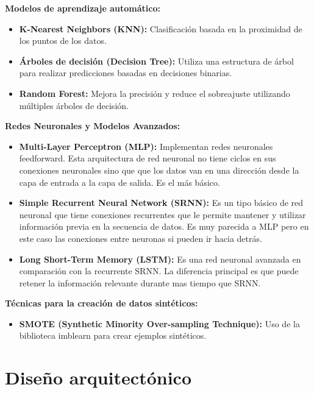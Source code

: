   \textbf{Modelos de aprendizaje automático:}

  \begin{itemize}
  \tightlist
  \item
   \textbf{K-Nearest Neighbors (KNN):} Clasificación basada en la proximidad de los puntos de los datos.
  \item
   \textbf{Árboles de decisión (Decision Tree):} Utiliza una estructura de árbol para realizar predicciones basadas en decisiones binarias.
  \item
   \textbf{Random Forest:} Mejora la precisión y reduce el sobreajuste utilizando múltiples árboles de decisión.
  \end{itemize}   

  \textbf{Redes Neuronales y Modelos Avanzados:}

  \begin{itemize}
  \tightlist
  \item
   \textbf{Multi-Layer Perceptron (MLP):} Implementan redes neuronales feedforward. Esta arquitectura de red neuronal no tiene ciclos en sus conexiones neuronales sino que que los datos van en una dirección desde la capa de entrada a la capa de salida. Es el más básico.
  \item
   \textbf{Simple Recurrent Neural Network (SRNN):} Es un tipo básico de red neuronal que tiene conexiones recurrentes que le permite mantener y utilizar información previa en la secuencia de datos. Es muy parecida a MLP pero en este caso las conexiones entre neuronas si pueden ir hacia detrás.
  \item
   \textbf{Long Short-Term Memory (LSTM):} Es una red neuronal avanzada en comparación con la recurrente SRNN. La diferencia principal es que puede retener la información relevante durante mas tiempo que SRNN.
  \end{itemize} 


  \textbf{Técnicas para la creación de datos sintéticos:}

  \begin{itemize}
  \tightlist
  \item
   \textbf{SMOTE (Synthetic Minority Over-sampling Technique):} Uso de la biblioteca imblearn para crear ejemplos sintéticos.
  \end{itemize}   
  


\section{Diseño arquitectónico}

